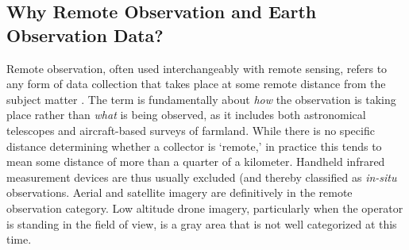 %
%
%
%


\subsection{Why Remote Observation and Earth Observation Data?} \label{sec:remote}

Remote observation, often used interchangeably with remote sensing, refers to any form of data collection that takes place at some remote distance from the subject matter \cite{jensenRemoteSensingEnvironment2006}. The term is fundamentally about \textit{how} the observation is taking place rather than \textit{what} is being observed, as it includes both astronomical telescopes and aircraft-based surveys of farmland. While there is no specific distance determining whether a collector is `remote,' in practice this tends to mean some distance of more than a quarter of a kilometer. Handheld infrared measurement devices are thus usually excluded (and thereby classified as \textit{in-situ} observations. Aerial and satellite imagery are definitively in the remote observation category. Low altitude drone imagery, particularly when the operator is standing in the field of view, is a gray area that is not well categorized at this time.

